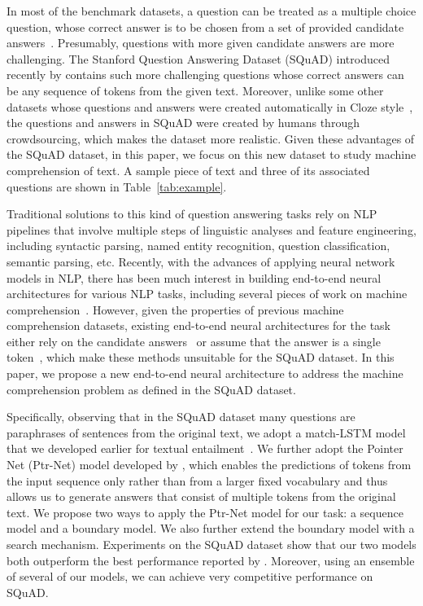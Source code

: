 \documentclass{article} \usepackage{iclr2017_conference,times}
\begin{document}
In most of the benchmark datasets, a question can be treated as a multiple choice question, whose correct answer is to be chosen from a set of provided candidate answers~\citep{richardsonmctest:EMNLP2013, hill2015goldilocks:ICLR2016}.  
Presumably, questions with more given candidate answers are more challenging. 
The Stanford Question Answering Dataset (SQuAD) introduced recently by \citet{rajpurkar2016squad} contains such more challenging questions whose
correct answers can be any sequence of tokens from the given text.
Moreover, unlike some other datasets whose questions and answers were created automatically in Cloze style~\citep{hermann2015teaching:nips2015, hill2015goldilocks:ICLR2016}, the questions and answers in SQuAD were created by humans through crowdsourcing, which makes the dataset more realistic.
Given these advantages of the SQuAD dataset, in this paper, we focus on this new dataset to study machine comprehension of text.
A sample piece of text and three of its associated questions are shown in Table~\ref{tab:example}.

Traditional solutions to this kind of question answering tasks rely on NLP pipelines that involve multiple steps of linguistic analyses and feature engineering, including syntactic parsing, named entity recognition, question classification, semantic parsing, etc.
Recently, with the advances of applying neural network models in NLP, there has been much interest in building end-to-end neural architectures for various NLP tasks, including several pieces of work on machine comprehension~\citep{hermann2015teaching:nips2015,hill2015goldilocks:ICLR2016,yin2016attention:NAACLWS2016,kadlec2016text:ACL2016,cui2016consensus:arxiv}.
However, given the properties of previous machine comprehension datasets, existing end-to-end neural architectures for the task either rely on the candidate answers~\citep{hill2015goldilocks:ICLR2016,yin2016attention:NAACLWS2016} or assume that the answer is a single token~\citep{hermann2015teaching:nips2015,kadlec2016text:ACL2016,cui2016consensus:arxiv}, which make these methods unsuitable for the SQuAD dataset. 
In this paper, we propose a new end-to-end neural architecture to address the machine comprehension problem as defined in the SQuAD dataset.

Specifically, observing that in the SQuAD dataset many questions are paraphrases of sentences from the original text, we adopt a match-LSTM model that we developed earlier for textual entailment~\citep{wang2015learning:NAACL2016}.
We further adopt the Pointer Net (Ptr-Net) model developed by \citet{vinyals2015pointer:NIPS2015}, which enables the predictions of tokens from the input sequence only rather than from a larger fixed vocabulary and thus allows us to generate answers that consist of multiple tokens from the original text.
We propose two ways to apply the Ptr-Net model for our task: a sequence model and a boundary model. 
We also further extend the boundary model with a search mechanism.
Experiments on the SQuAD dataset show that our two models both outperform the best performance reported by \citet{rajpurkar2016squad}.
Moreover, using an ensemble of several of our models, we can achieve very competitive performance on SQuAD.
\end{document}
